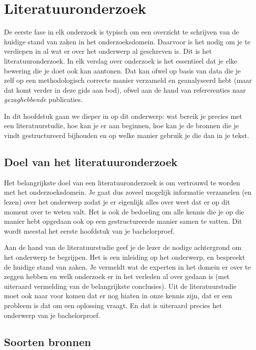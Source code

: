 \chapter{Literatuuronderzoek}
\label{ch:literatuuronderzoek}

De eerste fase in elk onderzoek is typisch om een overzicht te schrijven van de huidige stand van zaken in het onderzoeksdomein. Daarvoor is het nodig om je te verdiepen in al wat er over het onderwerp al geschreven is. Dit is het literatuuronderzoek. In elk verslag over onderzoek is het essentieel dat je elke bewering die je doet ook kan aantonen. Dat kan ofwel op basis van data die je zelf op een methodologisch correcte manier verzameld en geanalyseerd hebt (maar dat komt verder in deze gids aan bod), ofwel aan de hand van refererenties naar \emph{gezaghebbende} publicaties.

In dit hoofdstuk gaan we dieper in op dit onderwerp: wat bereik je precies met een literatuurstudie, hoe kan je er aan beginnen, hoe kan je de bronnen die je vindt gestructureerd bijhouden en op welke manier gebruik je die dan in je tekst.

\section{Doel van het literatuuronderzoek}
\label{sec:doel-literatuuronderzoek}

Het belangrijkste doel van een literatuuronderzoek is om vertrouwd te worden met het onderzoeksdomein. Je gaat dus zoveel mogelijk informatie verzamelen (en lezen) over het onderwerp zodat je er eigenlijk alles over weet dat er op dit moment over te weten valt. Het is ook de bedoeling om alle kennis die je op die manier hebt opgedaan ook op een gestructureerde manier samen te vatten. Dit wordt meestal het eerste hoofdstuk van je bachelorproef.

Aan de hand van de literatuurstudie geef je de lezer de nodige achtergrond om het onderwerp te begrijpen. Het is een inleiding op het onderwerp, en bespreekt de huidige stand van zaken. Je vermeldt wat de experten in het domein er over te zeggen hebben en welk onderzoek er in het verleden al over gedaan is (met uiteraard vermelding van de belangrijkste conclusies). Uit de literatuurstudie moet ook naar voor komen dat er nog hiaten in onze kennis zijn, dat er een probleem is dat om een oplossing vraagt. En dat is uiteraard precies het onderwerp van je bachelorproef.

\section{Soorten bronnen}
\label{sec:soorten-bronnen}

